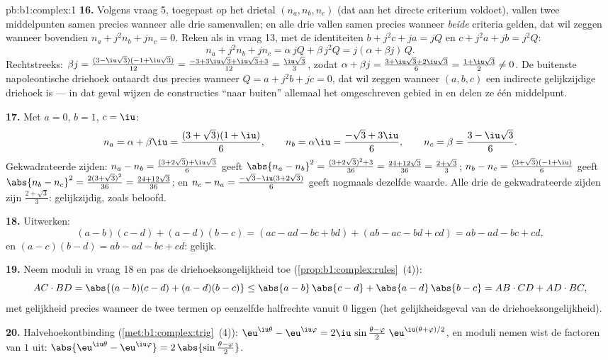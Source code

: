 \begin{solution}{pb:b1:complex:1}
\textbf{16.} Volgens vraag 5, toegepast op het drietal $(n_a, n_b, n_c)$
(dat aan het directe criterium voldoet), vallen twee middelpunten samen
precies wanneer alle drie samenvallen; en alle drie vallen samen precies
wanneer \emph{beide} criteria gelden, dat wil zeggen wanneer bovendien
$n_a + j^2 n_b + j n_c = 0$. Reken als in vraag 13, met de identiteiten
$b + j^2c + ja = jQ$ en $c + j^2a + jb = j^2Q$:
\[
n_a + j^2 n_b + j n_c
= \alpha\,jQ + \beta\,j^2 Q = j(\alpha + \beta j)\,Q .
\]
Rechtstreeks: $\beta j = \frac{(3 - \iu\sqrt3)(-1 + \iu\sqrt3)}{12} =
\frac{-3 + 3\iu\sqrt3 + \iu\sqrt3 + 3}{12} = \frac{\iu\sqrt3}3$, zodat
$\alpha + \beta j = \frac{3 + \iu\sqrt3 + 2\iu\sqrt3}6 = \frac{1 +
\iu\sqrt3}2 \neq 0$. De buitenste napoleontische driehoek ontaardt dus
precies wanneer $Q = a + j^2b + jc = 0$, dat wil zeggen wanneer $(a, b,
c)$ een indirecte gelijkzijdige driehoek is --- in dat geval wijzen de
constructies ``naar buiten'' allemaal het omgeschreven gebied in en
delen ze één middelpunt.

\textbf{17.} Met $a = 0$, $b = 1$, $c = \iu$:
\[
n_a = \alpha + \beta\iu = \frac{(3 + \sqrt3)(1 + \iu)}6,
\qquad
n_b = \alpha\iu = \frac{-\sqrt3 + 3\iu}6,
\qquad
n_c = \beta = \frac{3 - \iu\sqrt3}6 .
\]
Gekwadrateerde zijden: $n_a - n_b = \frac{(3 + 2\sqrt3) + \iu\sqrt3}6$
geeft $\abs{n_a - n_b}^2 = \frac{(3 + 2\sqrt3)^2 + 3}{36} = \frac{24 +
12\sqrt3}{36} = \frac{2 + \sqrt3}3$; $n_b - n_c = \frac{(3 + \sqrt3)(-1
+ \iu)}6$ geeft $\abs{n_b - n_c}^2 = \frac{2(3 + \sqrt3)^2}{36} =
\frac{24 + 12\sqrt3}{36}$; en $n_c - n_a = \frac{-\sqrt3 - \iu(3 +
2\sqrt3)}6$ geeft nogmaals dezelfde waarde. Alle drie de gekwadrateerde
zijden zijn $\frac{2 + \sqrt3}3$: gelijkzijdig, zoals beloofd.

\textbf{18.} Uitwerken:
\[
(a - b)(c - d) + (a - d)(b - c)
= (ac - ad - bc + bd) + (ab - ac - bd + cd)
= ab - ad - bc + cd ,
\]
en $(a - c)(b - d) = ab - ad - bc + cd$: gelijk.

\textbf{19.} Neem moduli in vraag 18 en pas de driehoeksongelijkheid toe
(\cref{prop:b1:complex:rules}~(4)):
\[
AC \cdot BD = \abs{(a-b)(c-d) + (a-d)(b-c)}
\leq \abs{a-b}\,\abs{c-d} + \abs{a-d}\,\abs{b-c}
= AB \cdot CD + AD \cdot BC ,
\]
met gelijkheid precies wanneer de twee termen op eenzelfde halfrechte
vanuit $0$ liggen (het gelijkheidsgeval van de driehoeksongelijkheid).

\textbf{20.} Halvehoekontbinding (\cref{met:b1:complex:trig}~(4)):
$\eu^{\iu\theta} - \eu^{\iu\varphi} = 2\iu\,\sin\frac{\theta - \varphi}2
\;\eu^{\iu(\theta + \varphi)/2}$, en moduli nemen wist de factoren van
 $1$ uit: $\abs{\eu^{\iu\theta} - \eu^{\iu\varphi}} =
2\,\abs{\sin\frac{\theta - \varphi}2}$.


\end{solution}
